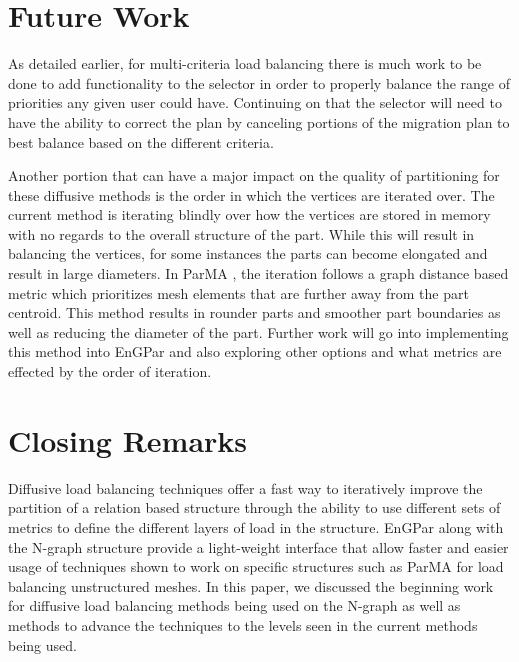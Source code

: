 \documentclass[a4paper]{article}
\begin{document}
\section{Future Work}
As detailed earlier, for multi-criteria load balancing there is much work to be done to add functionality to the selector in order to properly balance the range of priorities any given user could have. Continuing on that the selector will need to have the ability to correct the plan by canceling portions of the migration plan to best balance based on the different criteria.

Another portion that can have a major impact on the quality of partitioning for these diffusive methods is the order in which the vertices are iterated over. The current method is iterating blindly over how the vertices are stored in memory with no regards to the overall structure of the part. While this will result in balancing the vertices, for some instances the parts can become elongated and result in large diameters. In ParMA \cite{SmithParma2015}, the iteration follows a graph distance based metric which prioritizes mesh elements that are further away from the part centroid. This method results in rounder parts and smoother part boundaries as well as reducing the diameter of the part. Further work will go into implementing this method into EnGPar and also exploring other options and what metrics are effected by the order of iteration.

\section{Closing Remarks}
Diffusive load balancing techniques offer a fast way to iteratively improve the partition of a relation based structure through the ability to use different sets of metrics to define the different layers of load in the structure. EnGPar along with the N-graph structure provide a light-weight interface that allow faster and easier usage of techniques shown to work on specific structures such as ParMA for load balancing unstructured meshes. In this paper, we discussed the beginning work for diffusive load balancing methods being used on the N-graph as well as methods to advance the techniques to the levels seen in the current methods being used.


\newpage 

\end{document}
